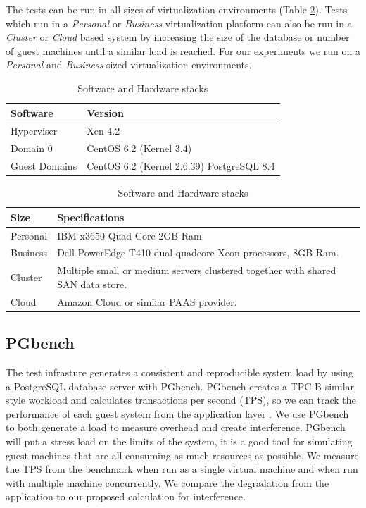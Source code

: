 \indent The tests can be run in all sizes of virtualization environments (Table \ref{virtSize}).  
Tests which run in a \emph{Personal} or \emph{Business} virtualization platform can also be run in a \emph{Cluster} or \emph{Cloud} based system by increasing the size of the database or number of guest machines until a similar load is reached.  
For our experiments we run on a \emph{Personal} and \emph{Business} sized virtualization environments. 

\begin{table}[h]
\begin{subtable}[h]{0.45\textwidth}
\begin{tabular}{ l p{5cm} }
  Software & Version \\
  \hline
  Hyperviser & Xen 4.2 \\
  Domain 0 & CentOS 6.2 (Kernel 3.4) \\
  Guest Domains & CentOS 6.2 (Kernel 2.6.39) PostgreSQL 8.4 \\
  \hline
\end{tabular}
\caption{Software installed virtualization test stack}
\label{softStack}
\end{subtable}
\hfill
\begin{subtable}[h]{0.45\textwidth}
\begin{tabular}{ l p{5cm} }
  Size & Specifications \\
  \hline
  Personal & IBM x3650 Quad Core 2GB Ram \\
  Business & Dell PowerEdge T410 dual quadcore Xeon processors, 8GB Ram. \\
  Cluster & Multiple small or medium servers clustered together with shared SAN data store. \\
  Cloud & Amazon Cloud or similar PAAS provider. \\
  \hline
\end{tabular}
\caption{Virtualization sizes for tests}
\label{virtSize}
\end{subtable}
\caption{Software and Hardware stacks}
\end{table}

\subsection{PGbench}
\indent The test infrasture generates a consistent and reproducible system load by using a PostgreSQL database server with PGbench. 
PGbench creates a TPC-B similar style workload and calculates transactions per second (TPS), so we can track the performance of each guest system from the application layer \cite{pgTune}.  
We use PGbench to both generate a load to measure overhead and create interference.
PGbench will put a stress load on the limits of the system, it is a good tool for simulating guest machines that are all consuming as much resources as possible.  
We measure the TPS from the benchmark when run as a single virtual machine and when run with multiple machine concurrently.  We compare the degradation from the application to our proposed calculation for interference.

